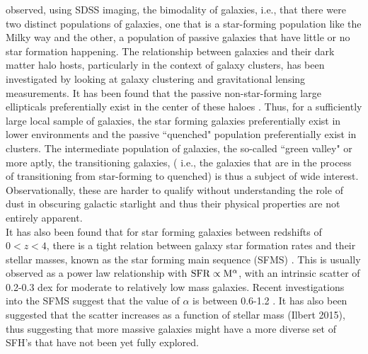 \citet{2001AJ....122.1861S} observed, using SDSS imaging, the bimodality of galaxies, i.e., that there were two distinct populations of galaxies, one that is a star-forming population like the Milky way and the other, a population of passive galaxies that have little or no star formation happening. The relationship between galaxies and their dark matter halo hosts, particularly in the context of galaxy clusters, has been investigated by looking at galaxy clustering and gravitational lensing measurements. It has been found that the passive non-star-forming large ellipticals preferentially exist in the center of these haloes \citep{2005ApJ...633..791Z}. Thus, for a sufficiently large local sample of galaxies, the star forming galaxies preferentially exist in lower environments and the passive ``quenched" population preferentially exist in clusters. The intermediate population of galaxies, the so-called ``green valley" \citep{2007ApJS..173..293W} or more aptly, the transitioning galaxies, ( i.e., the galaxies that are in the process of transitioning from star-forming to quenched) is thus a subject of wide interest. Observationally, these are harder to qualify without understanding the role of dust in obscuring galactic starlight and thus their physical properties are not entirely apparent.\\

It has also been found that for star forming galaxies between redshifts of $0 < z < 4$, there is a tight relation between galaxy star formation rates and their stellar masses, known as the star forming main sequence (SFMS) \citep{brinchmann_physical_2004, 2007ApJ...660L..43N, 2015A&A...575A..74S}. This is usually observed as a power law relationship with ${\rm SFR} \propto {\rm M}^{\alpha}$, with an intrinsic scatter of 0.2-0.3 dex for moderate to relatively low mass galaxies. Recent investigations into the SFMS suggest that the value of $\alpha$ is between 0.6-1.2 \citep{2014ApJS..214...15S}. It has also been suggested that the scatter increases as a function of stellar mass (Ilbert 2015), thus suggesting that more massive galaxies might have a more diverse set of SFH's that have not been yet fully explored.\\

